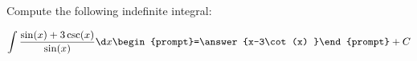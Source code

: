 \documentclass{ximera}
\author{Jim Talamo}
\begin{document}
\begin{exercise}
Compute the following indefinite integral:

\[
\int \frac{\sin(x)+3\csc(x)}{\sin(x)}  \d x 
\begin{prompt}=\answer{x-3\cot(x) }\end{prompt}+C
\]
\end{exercise}
\end{document}
